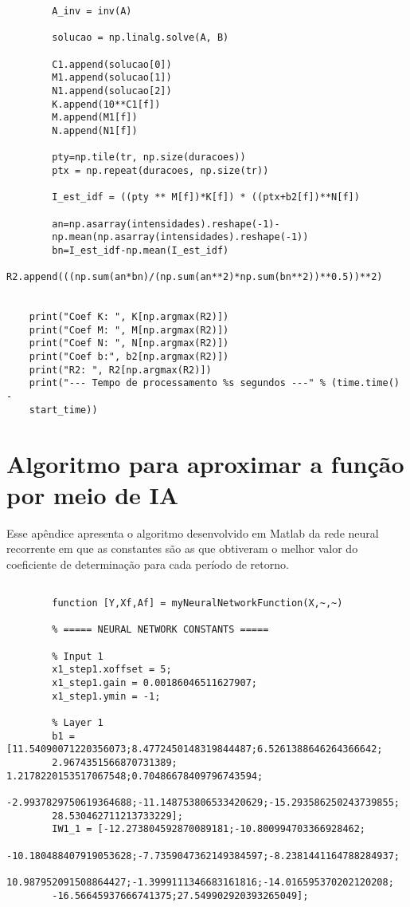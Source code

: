 \begin{apendicesenv}
\begin{verbatim}
        A_inv = inv(A)
    
        solucao = np.linalg.solve(A, B)
    
        C1.append(solucao[0])
        M1.append(solucao[1])
        N1.append(solucao[2])
        K.append(10**C1[f])
        M.append(M1[f])
        N.append(N1[f])
    
        pty=np.tile(tr, np.size(duracoes))
        ptx = np.repeat(duracoes, np.size(tr))
    
        I_est_idf = ((pty ** M[f])*K[f]) * ((ptx+b2[f])**N[f])
    
        an=np.asarray(intensidades).reshape(-1)-
        np.mean(np.asarray(intensidades).reshape(-1))
        bn=I_est_idf-np.mean(I_est_idf)
        R2.append(((np.sum(an*bn)/(np.sum(an**2)*np.sum(bn**2))**0.5))**2)
    
    
    print("Coef K: ", K[np.argmax(R2)])
    print("Coef M: ", M[np.argmax(R2)])
    print("Coef N: ", N[np.argmax(R2)])
    print("Coef b:", b2[np.argmax(R2)])
    print("R2: ", R2[np.argmax(R2)])
    print("--- Tempo de processamento %s segundos ---" % (time.time() - 
    start_time))
\end{verbatim}

\chapter{Algoritmo para aproximar a função por meio de IA}

Esse apêndice apresenta o algoritmo desenvolvido em Matlab da rede neural recorrente em que as constantes são as que obtiveram o melhor valor do coeficiente de determinação para cada período de retorno. 

\begin{verbatim}

        function [Y,Xf,Af] = myNeuralNetworkFunction(X,~,~)

        % ===== NEURAL NETWORK CONSTANTS =====
        
        % Input 1
        x1_step1.xoffset = 5;
        x1_step1.gain = 0.00186046511627907;
        x1_step1.ymin = -1;
        
        % Layer 1
        b1 = [11.54090071220356073;8.4772450148319844487;6.5261388646264366642;
        2.9674351566870731389; 1.2178220153517067548;0.70486678409796743594;
        -2.9937829750619364688;-11.148753806533420629;-15.293586250243739855;
        28.530462711213733229];
        IW1_1 = [-12.273804592870089181;-10.800994703366928462;
        -10.180488407919053628;-7.7359047362149384597;-8.2381441164788284937;
        10.987952091508864427;-1.3999111346683161816;-14.016595370202120208;
        -16.56645937666741375;27.549902920393265049];
        

\end{verbatim}
\end{apendicesenv}
